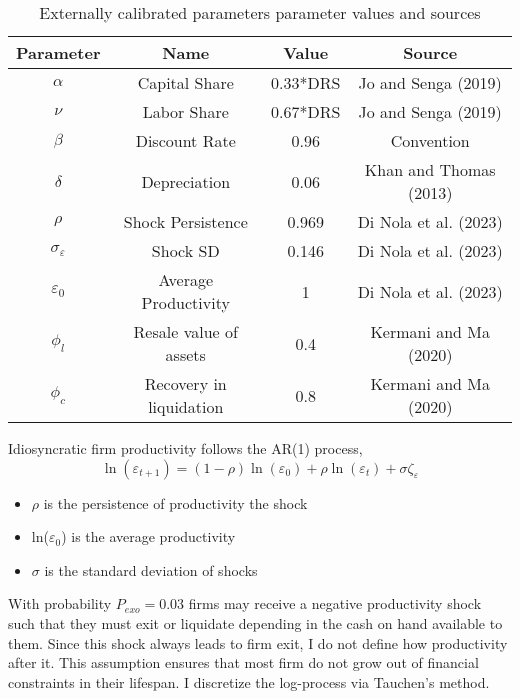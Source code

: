 \documentclass[12pt]{article}
\begin{document}
\begin{table}[h!]
    \centering
    \begin{tabular}{c|c|c|c}
    \toprule
    \textbf{Parameter} & \textbf{Name} & \textbf{Value} & \textbf{Source} \\
    \midrule
    $\alpha$ & Capital Share & 0.33*DRS & Jo and Senga (2019) \\
    $\nu$ & Labor Share & 0.67*DRS & Jo and Senga (2019) \\
    $\beta$ & Discount Rate & 0.96 & Convention \\
    $\delta$ & Depreciation & 0.06 & Khan and Thomas (2013) \\
    $\rho$ & Shock Persistence & 0.969 & Di Nola et al. (2023) \\
    $\sigma_{\varepsilon}$ & Shock SD & 0.146 & Di Nola et al. (2023)  \\
    $\varepsilon_0$ & Average Productivity & 1 & Di Nola et al. (2023)  \\
    $\phi_l$ & Resale value of assets & 0.4 & Kermani and Ma (2020) \\ 
    $\phi_c$ & Recovery in liquidation & 0.8 & Kermani and Ma (2020) \\    
    \bottomrule
    \end{tabular}
    \caption{Externally calibrated parameters parameter values and sources}
    \label{tab:external calib}
\end{table}
\noindent Idiosyncratic firm productivity follows the AR(1) process,
$$ \ln(\varepsilon_{t+1}) = (1-\rho) \ln(\varepsilon_0) + \rho \ln(\varepsilon_t) + \sigma \zeta_\varepsilon $$
\begin{itemize}\setlength\itemsep{0em} \small
    \item $\rho$ is the persistence of productivity the shock
    \item ln($\varepsilon_0$) is the average productivity
    \item $\sigma$ is the standard deviation of shocks
\end{itemize} \normalsize
With probability $P_{exo} = 0.03$ firms may receive a negative productivity shock such that they must exit or liquidate depending in the cash on hand available to them. Since this shock always leads to firm exit, I do not define how productivity after it. This assumption ensures that most firm do not grow out of financial constraints in their lifespan. I discretize the log-process via Tauchen's method. \vspace{3mm} \\ 
\end{document}
